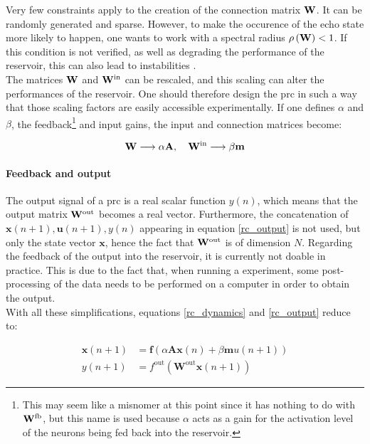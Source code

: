 Very few constraints apply to the creation of the connection matrix $\mathbf{W}$. It can be randomly generated and sparse. However, to make the occurence of the echo state more likely to happen, one wants to work with a spectral radius $\rho \left( \mathbf{W} \right)<1$. If this condition is not verified, as well as degrading the performance of the reservoir, this can also lead to instabilities \cite{Lukoeviius2009}.\\

The matrices $\mathbf{W}$ and $\mathbf{W}^{\text{in}}$ can be rescaled, and this scaling can alter the performances of the reservoir. One should therefore design the \gls{prc} in such a way that those scaling factors are easily accessible experimentally. If one defines $\alpha$ and $\beta$, the feedback\footnote{This may seem like a misnomer at this point since it has nothing to do with $\mathbf{W}^{\text{fb}}$, but this name is used because $\alpha$ acts as a gain for the activation level of the neurons being fed back into the reservoir.} and input gains, the input and connection matrices become:

\begin{equation}
	\mathbf{W} \longrightarrow \alpha \mathbf{A}, \quad \mathbf{W}^{\text{in}} \longrightarrow \beta \mathbf{m}
\end{equation}

\paragraph{Feedback and output}

The output signal of a \gls{prc} is a real scalar function $y(n)$, which means that the output matrix $\mathbf{W}^{\text{out}}$ becomes a real vector. Furthermore, the concatenation of $\mathbf{x}(n+1), \mathbf{u}(n+1), y(n)$ appearing in equation \eqref{rc_output} is not used, but only the state vector $\mathbf{x}$, hence the fact that $\mathbf{W}^{\text{out}}$ is of dimension $N$. Regarding the feedback of the output into the reservoir, it is currently not doable in practice. This is due to the fact that, when running a \rc experiment, some post-processing of the data needs to be performed on a computer in order to obtain the output.\\

With all these simplifications, equations \eqref{rc_dynamics} and \eqref{rc_output} reduce to:

\begin{align}
	\mathbf{x}(n+1) &= \mathbf{f} \left( \alpha \mathbf{A} \mathbf{x}(n) + \beta \mathbf{m} u(n+1) \right)\\
	y(n+1) &= f^{\text{out}} \left( \mathbf{W}^{\text{out}} \mathbf{x}(n+1) \right)
\end{align}

